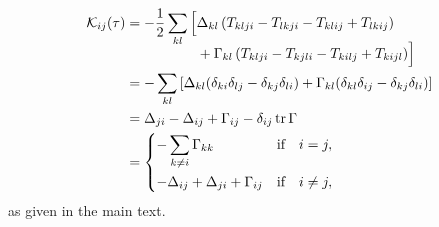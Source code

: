 \begin{align}
    \cumulantfun_{ij}(\tau) &= -\frac{1}{2}\sum_{kl}\begin{aligned}[t]\Bigl[
                                   &\freqshifts_{kl}\left(T_{klji} - T_{lkji} - T_{klij} + T_{lkij}\right) \\
                                   &+ \decayamps_{kl}\left(T_{klji} - T_{kjli} - T_{kilj} + T_{kijl}\right)
                               \Bigr]\end{aligned} \\
                            &= -\sum_{kl}\left[\freqshifts_{kl}(\delta_{ki}\delta_{lj} - \delta_{kj}\delta_{li})
                                               + \decayamps_{kl}(\delta_{kl}\delta_{ij} - \delta_{kj}\delta_{li})\right] \\
                            &= \freqshifts_{ji} - \freqshifts_{ij} + \decayamps_{ij} - \delta_{ij}\tr\decayamps \\
                            &= \begin{dcases}
                                  - \sum_{k\neq i}\decayamps_{kk}                           &\qif* i = j,   \\
                                  - \freqshifts_{ij} + \freqshifts_{ji} + \decayamps_{ij}   &\qif* i\neq j,
                               \end{dcases}
\end{align}
as given in the main text.

